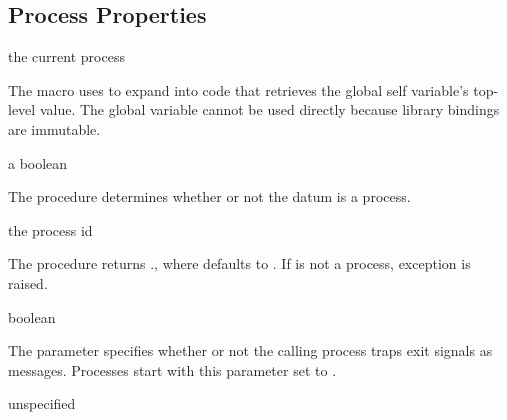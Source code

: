 \subsection {Process Properties}

\begin{syntax}
\end{syntax}
\returns{} the current process

The  macro uses  to expand into
code that retrieves the global self variable's top-level value. The
global variable cannot be used directly because library bindings are
immutable.

\begin{procedure}
\end{procedure}
\returns{} a boolean

The  procedure determines whether or not the datum
 is a process.

\begin{procedure}
\end{procedure}
\returns{} the process id

The  procedure returns .,
where  defaults to . If  is not
a process, exception  is
raised.

\begin{parameter}
\end{parameter}
\hasvalue{} boolean

The  parameter specifies whether or not the
calling process traps exit signals as messages. Processes start with
this parameter set to .

\begin{procedure}
\end{procedure}
\returns{} unspecified

